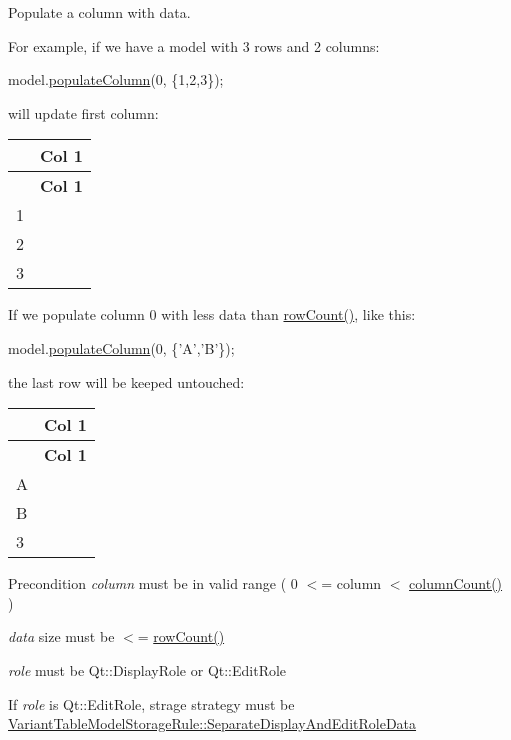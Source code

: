 Populate a column with data. 

For example, if we have a model with 3 rows and 2 columns\+: 
\begin{DoxyCode}
model.\hyperlink{class_mdt_1_1_item_model_1_1_variant_table_model_a7d5a58a9383e56d61c5066085e36c9e6}{populateColumn}(0, \{1,2,3\});
\end{DoxyCode}
 will update first column\+: \tabulinesep=1mm
\begin{longtabu} spread 0pt [c]{*2{|X[-1]}|}
\hline
{}&{\bf Col 1 }\\
\endfirsthead
\hline
\endfoot
\hline
{}&{\bf Col 1 }\\
&\\
2&\\
3&\\
\end{longtabu}
If we populate column 0 with less data than \hyperlink{class_mdt_1_1_item_model_1_1_variant_table_model_a76330ef86b94573e02a61946e50e99a9}{row\+Count()}, like this\+: 
\begin{DoxyCode}
model.\hyperlink{class_mdt_1_1_item_model_1_1_variant_table_model_a7d5a58a9383e56d61c5066085e36c9e6}{populateColumn}(0, \{\textcolor{charliteral}{'A'},\textcolor{charliteral}{'B'}\});
\end{DoxyCode}
 the last row will be keeped untouched\+: \tabulinesep=1mm
\begin{longtabu} spread 0pt [c]{*2{|X[-1]}|}
\hline
{}&{\bf Col 1 }\\
\endfirsthead
\hline
\endfoot
\hline
{}&{\bf Col 1 }\\
\endhead
A&\\
B&\\
3&\\
\end{longtabu}


\begin{DoxyPrecond}{Precondition}
{\itshape column} must be in valid range ( 0 $<$= column $<$ \hyperlink{class_mdt_1_1_item_model_1_1_variant_table_model_acd4d14fc0041cdd9e509987e49dcf5b3}{column\+Count()} ) 

{\itshape data} size must be $<$= \hyperlink{class_mdt_1_1_item_model_1_1_variant_table_model_a76330ef86b94573e02a61946e50e99a9}{row\+Count()} 

{\itshape role} must be Qt\+::\+Display\+Role or Qt\+::\+Edit\+Role 

If {\itshape role} is Qt\+::\+Edit\+Role, strage strategy must be \hyperlink{namespace_mdt_1_1_item_model_ad48e47e80d7e13b5b951346649748190a8e198c923f2850676a3665c1ddc73204}{Variant\+Table\+Model\+Storage\+Rule\+::\+Separate\+Display\+And\+Edit\+Role\+Data} 
\end{DoxyPrecond}


